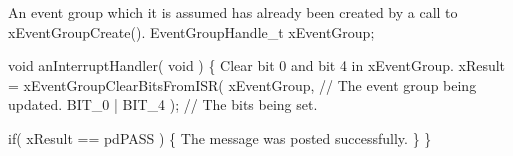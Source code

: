 \begin{DoxyPre}An event group which it is assumed has already been created by a call to
xEventGroupCreate().
   EventGroupHandle\_t xEventGroup;\end{DoxyPre}



\begin{DoxyPre}   void anInterruptHandler( void )
   \{
Clear bit 0 and bit 4 in xEventGroup.
        xResult = xEventGroupClearBitsFromISR(
                            xEventGroup,     // The event group being updated.
                            BIT\_0 | BIT\_4 ); // The bits being set.\end{DoxyPre}



\begin{DoxyPre}        if( xResult == pdPASS )
        \{
The message was posted successfully.
        \}
  \}
   \end{DoxyPre}
 
